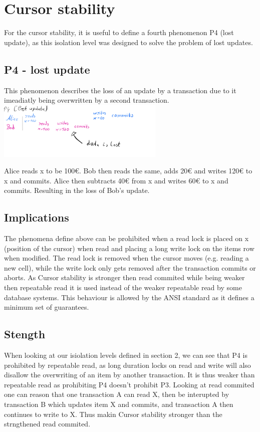 \documentclass[sigconf, review=true]{acmart}
\begin{document}
\section{Cursor stability}
For the cursor stability, it is useful to define a fourth phenomenon P4 (lost update), as this isolation level
was designed to solve the problem of lost updates.
\subsection{ P4 - lost update}
This phenomenon describes the loss of an update by a transaction due to it imeadiatly being overwritten
by a second transaction.
\includegraphics[width=8cm]{P4}
\begin{example}
    Alice reads x to be 100€. Bob then reads the same, adds 20€ and writes 120€ to x and commits.
    Alice then subtracts 40€ from x and writes 60€ to x and commits. Resulting in the loss of Bob's update.
    \subsection{Implications}
    The phenomena define above can be prohibited when a read lock is placed on x (position of the cursor) when
    read and placing a long write lock on the items row when modified.
    The read lock is removed when the cursor moves (e.g. reading a new cell),
    while the write lock only gets removed after the transaction commits or aborts.
    As Cursor stability is stronger then read commited while being weaker then repeatable read it
    is used instead of the weaker repeatable read by some database systems. This behaviour is allowed by the ANSI standard
    as it defines a minimum set of guarantees.
\end{example}
\subsection{Stength}
When looking at our isiolation levels defined in section 2, we can see that P4 is prohibited by repeatable read,
as long duration locks on read and write will also disallow the overwriting of an item by another transaction.
It is thus weaker than repeatable read as prohibiting P4 doesn't prohibit P3.
Looking at read commited one can reason that one transaction A can read X, then be interupted by transaction B which updates
item X and commits, and transaction A then continues to write to X.
Thus makin Cursor stability stronger than the strngthened read commited.
\end{document}
